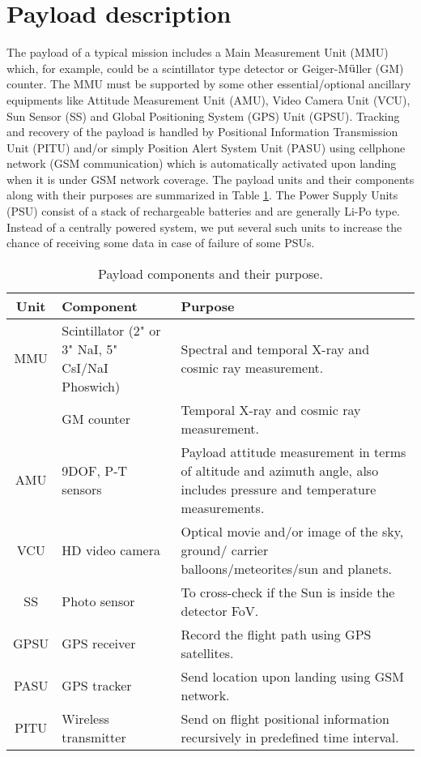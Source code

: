 \section{Payload description}
\label{sec:payl}
The payload of a typical mission includes a Main Measurement Unit (MMU)
which, for example, could be a scintillator type detector or Geiger-M$\rm{\ddot{u}}$ller 
(GM) counter. The MMU must be supported by some other essential/optional 
ancillary equipments like Attitude Measurement Unit (AMU), Video Camera Unit 
(VCU), Sun Sensor (SS) and Global Positioning System (GPS) Unit (GPSU). 
Tracking and recovery of the payload is handled by Positional Information 
Transmission Unit (PITU) and/or simply Position Alert System Unit (PASU) 
using cellphone network (GSM communication) which is automatically
activated upon landing when it is under GSM network coverage. The payload units
and their components along with their purposes are summarized in Table
\ref{tab:payload}. The Power Supply Units (PSU) consist of a stack of rechargeable 
batteries and are generally Li-Po type. Instead of a centrally powered 
system, we put several such units to
increase the chance of receiving some data in case of failure of some PSUs.

\begin{table}[h]
 \begin{center}
   \begin{tabular}{cp{3cm}p{6cm}}
    \hline
    {\bf Unit} & {\bf Component} & {\bf Purpose} \\
    \hline
    \hline
    MMU & Scintillator (2" or 3" NaI, 5" CsI/NaI Phoswich) & Spectral and 
    temporal X-ray and cosmic ray measurement. \\
    & GM counter & Temporal X-ray and cosmic ray measurement. \\
    \hline
    AMU & 9DOF, P-T sensors & Payload attitude measurement in terms of altitude
    and azimuth angle, also includes pressure and temperature measurements. \\
    \hline
    VCU & HD video camera & Optical movie and/or image of the sky, ground/
    carrier balloons/meteorites/sun and planets. \\
    \hline
    SS & Photo sensor & To cross-check if the Sun is inside the detector FoV. \\
    \hline
    GPSU & GPS receiver & Record the flight path using GPS satellites. \\
    \hline
    PASU & GPS tracker & Send location upon landing using GSM network. \\  
    \hline
    PITU & Wireless transmitter & Send on flight positional information
    recursively in predefined time interval. \\
    \hline
   \end{tabular}
   \caption{Payload components and their purpose.}
   \label{tab:payload}
 \end{center}
\end{table}

